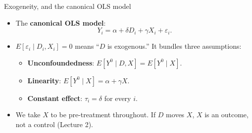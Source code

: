 \documentclass[
  11pt,
  ignorenonframetext,
  aspectratio=169,
]{beamer}
\providecommand{\tightlist}{%
  \setlength{\itemsep}{0pt}\setlength{\parskip}{0pt}}
\begin{document}
\begin{frame}{Exogeneity, and the canonical OLS model}
\protect{}\label{exogeneity-and-the-canonical-ols-model}
\begin{itemize}
\tightlist
\item
  The \textbf{canonical OLS model}: \[
  Y_i = \alpha + \delta D_i + \gamma X_i + \varepsilon_i.
  \]
\item
  \(E[\varepsilon_i \mid D_i, X_i] = 0\) means ``\(D\) is exogenous.''
  It bundles three assumptions:

  \begin{itemize}
  \tightlist
  \item
    \textbf{Unconfoundedness}: \(E[Y^0 \mid D, X] = E[Y^0 \mid X]\).
  \item
    \textbf{Linearity}: \(E[Y^0 \mid X] = \alpha + \gamma X\).
  \item
    \textbf{Constant effect}: \(\tau_i = \delta\) for every \(i\).
  \end{itemize}
\item
  We take \(X\) to be pre-treatment throughout. If \(D\) moves \(X\),
  \(X\) is an outcome, not a control (Lecture 2).
\end{itemize}
\end{frame}
\end{document}
